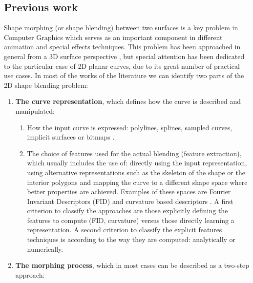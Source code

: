 \documentclass{ipol}
\begin{document}
\subsection{Previous work}
Shape morphing (or shape blending) between two surfaces is a key problem in Computer Graphics which serves as an important component in different animation and special effects techniques.
This problem has been approached in general from a 3D surface perspective \cite{math:computer_graphics:alexa:2000:as_rigid_as_possible_shape_interpolation}, but special attention has been dedicated to the particular case of 2D planar curves, due to its great number of practical use cases.
In most of the works of the literature we can identify two parts of the 2D shape blending problem: 
  
\begin{enumerate}
    \item \textbf{The curve representation}, which defines how the curve is described and manipulated:
        \begin{enumerate}
            \item How the input curve is expressed: polylines, splines, sampled curves, implicit surfaces or bitmaps .
            \item The choice of features used for the actual blending (feature extraction), which usually includes the use of:
            directly using the input representation, using alternative representations such as the skeleton of the shape \cite{computer_science:computer_graphics:shapira:1995:shape_blending_using_the_star_skeleton} or the interior polygons and mapping the curve to a different shape space where better properties are achieved. Examples of these spaces are Fourier Invariant Descriptors (FID) \cite{math:computer_graphics:curve_blending:ghorbel:2020:fast_blending_of_planar_shapes} and curvature based descriptors \cite{im_proc:curve_interpolation:elber:07:metamorphosis_planar_parametric_curves} . A first criterion to classify the approaches are those explicitly defining the features to compute (FID, curvature) versus those directly learning a representation. A second criterion to classify the explicit features techniques is according to the way they are computed: analytically or numerically.
        \end{enumerate}
    \item \textbf{The morphing process}, which in most cases can be described as a two-step approach:
        \begin{enumerate}

\end{enumerate}
\end{enumerate}
\end{document}

